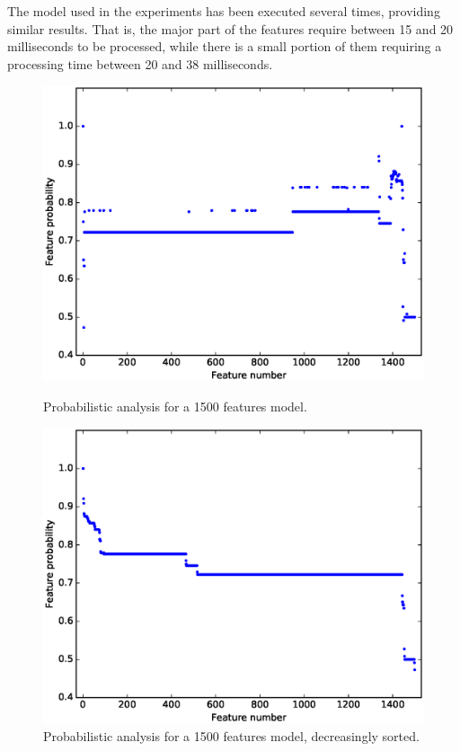 The model used in the experiments has been executed several times, providing similar results. That is, the
major part of the features require between 15 and 20 milliseconds to be processed, while there is a small
portion of them requiring a processing time between 20 and 38 milliseconds.


\begin{figure}[h]
	\centering
	\begin{minipage}[b]{0.48\textwidth}
		\includegraphics[width=\textwidth]{plot_probs_probs.eps}
\caption{Probabilistic analysis for a 1500 features model.}\label{fig:plot:probs:probs}
	\end{minipage}
	\hfill
	\begin{minipage}[b]{0.48\textwidth}
		\includegraphics[width=\textwidth]{plot_probs_probs_sorted.eps}
	\caption{Probabilistic analysis for a 1500 features model, decreasingly sorted.}\label{fig:plot:probs:probs:sorted}
	\end{minipage}
\end{figure}


